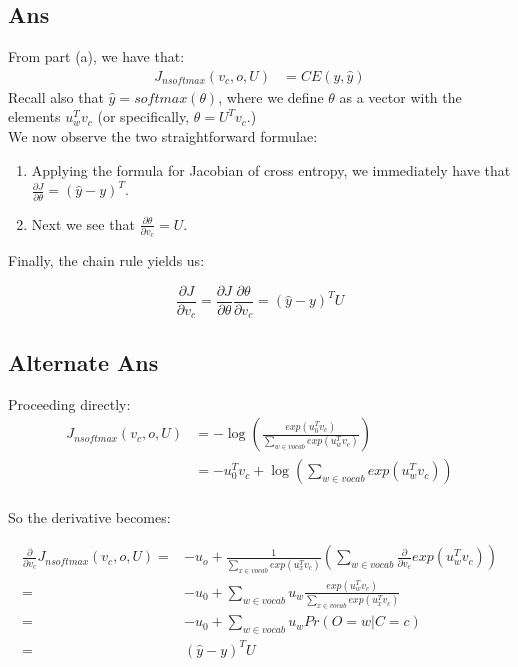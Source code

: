 \documentclass{article}
\begin{document}
\subsection*{Ans}
From part (a), we have that:
\begin{align*}J_{nsoftmax}(v_c, o, U) &= CE(y, \hat{y})
\end{align*}
Recall also that $\hat{y} = softmax(\theta)$, where we define $\theta$ 
as a vector with the elements $u_w^T v_c$ (or specifically, $\theta = U^T v_c$.) \\ We now observe the two straightforward formulae:

\begin{enumerate}
 \item{Applying the formula for Jacobian of cross entropy, we immediately have that $\frac{\partial J}{\partial \theta} = (\hat{y} - y)^T$.}
\item{Next we see that $\frac{\partial \theta}{\partial v_c} = U$.}
\end{enumerate}

Finally, the chain rule yields us:

\begin{equation}
\frac{\partial J}{\partial v_c} = \frac{\partial J}{\partial \theta} \frac{\partial \theta}{\partial v_c} = (\hat{y} - y)^T U 
\end{equation}


\subsection*{Alternate Ans}
Proceeding directly:
\begin{align*}J_{nsoftmax}(v_c, o, U) &= -\log \left( \frac{exp(u_0^T v_c)}{\sum_{w \in vocab} exp(u_w^T v_c)  }    \right) \\
&= -u_0^T v_c + \log \left(\sum_{w \in vocab} exp(u_w^T v_c) \right)
\end{align*}
\\ So the derivative becomes:

\begin{align*}
\frac{\partial}{\partial v_c} J_{nsoftmax}(v_c, o, U) =& - u_o + \frac{1}{\sum_{x \in vocab} exp(u_x^T v_c)}\left(\sum_{w \in vocab} \frac{\partial}{\partial v_c} exp(u_w^T v_c) \right) \\
=&-u_0 + \sum_{w \in vocab} u_w \frac{exp(u_w^T v_c)}{\sum_{x \in vocab} exp(u_x^T v_c)} \\
=& -u_0 + \sum_{w \in vocab} u_w Pr(O = w | C = c) \\
=& (\hat{y} -y)^T U
\end{align*}
\end{document}
